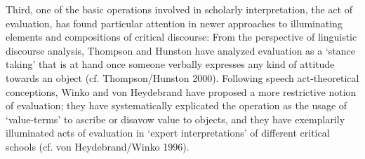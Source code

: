 Third, one of the basic operations involved in scholarly interpretation, the act of evaluation, has found particular attention in newer approaches to illuminating elements and compositions of critical discourse: From the perspective of linguistic discourse analysis, Thompson and Hunston have analyzed evaluation as a `stance taking' that is at hand once someone verbally expresses any kind of attitude towards an object (cf. Thompson/Hunston 2000). Following speech act-theoretical conceptions, Winko and von Heydebrand have proposed a more restrictive notion of evaluation; they have systematically explicated the operation as the usage of `value-terms' to ascribe or disavow value to objects, and they have exemplarily illuminated acts of evaluation in `expert interpretations' of different critical schools (cf. von Heydebrand/Winko 1996).
